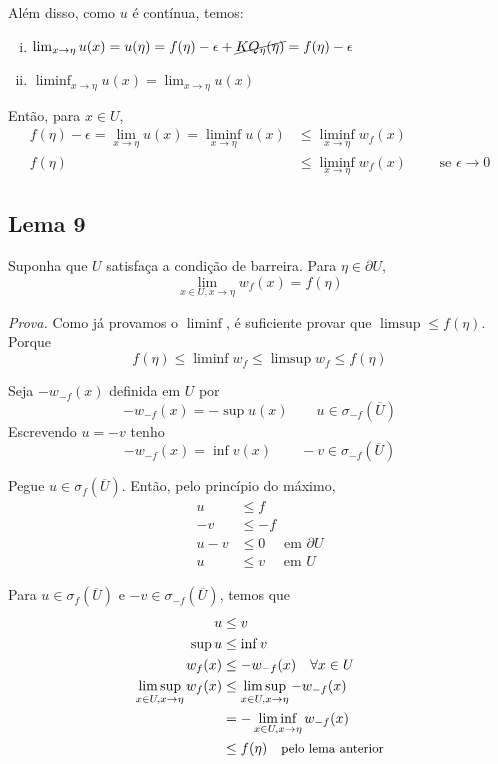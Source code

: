 \documentclass[11pt]{article}
\newcommand{\p}{\partial}
\newcommand{\e}{\epsilon}
\begin{document}
Além disso, como \(u\) é contínua, temos:\begin{enumerate}[(i)]
	\item \(\lim_{x \rightarrow \eta} u(x) = u(\eta) = f(\eta) - \e + \cancel{K Q_\eta(\eta)} = f(\eta) - \e\) 
	\item \(\liminf_{x \rightarrow \eta} u(x) = \lim_{x \rightarrow \eta} u(x) \)
\end{enumerate}

Então, para \(x \in U\),
\begin{align*}
	f(\eta) - \e = \lim_{x \rightarrow \eta} u(x) = \liminf_{x \rightarrow \eta} u(x) &\leq \liminf_{x \rightarrow \eta}  w_f(x) \\
	f(\eta) &\leq  \liminf_{x \rightarrow \eta} w_f(x) \qquad \text{ se } \e \rightarrow 0 
\end{align*}

\subsection*{Lema 9}

Suponha que \(U\) satisfaça a condição de barreira.
Para \(\eta \in \p U\), \[\lim_{x \in U, x \rightarrow \eta} w_f(x) = f(\eta)\]

\textit{Prova.} Como já provamos o \(\liminf\), é suficiente provar que \(\limsup \leq f(\eta)\). Porque \[f(\eta) \leq \liminf w_f \leq \limsup w_f \leq f(\eta)\]

Seja \(-w_{-f}(x)\) definida em \(U\) por \[-w_{-f}(x) = - \sup u(x) \qquad u \in \sigma_{-f}(\overline{U})\]
Escrevendo \(u=-v\) tenho \[-w_{-f}(x) = \inf v(x) \qquad -v \in \sigma_{-f}(\overline{U})\]

Pegue \(u \in \sigma_f(\overline{U})\). Então, pelo princípio do máximo, \begin{align*}
	u &\leq f \\
	-v &\leq -f \\
	u-v&\leq 0 \quad \text{ em } \p U \\
	u &\leq v \quad \text{ em } U 
\end{align*}

Para \(u \in \sigma_f(\overline{U})\) e \(-v \in \sigma_{-f}(\overline{U})\), temos que \begin{align*}
	u &\leq v \\
	\sup u &\leq \inf v \\
	w_f(x) &\leq -w_{-f}(x) \quad \forall x \in U \\
	\limsup_{x \in U, x \rightarrow \eta}  w_f(x) &\leq \limsup_{x \in U, x \rightarrow \eta} -w_{-f}(x) \\
	&=- \liminf_{x \in U, x \rightarrow \eta} w_{-f}(x) \\
	&\leq f(\eta) \quad \text{\small pelo lema anterior}
\end{align*}
\end{document}
